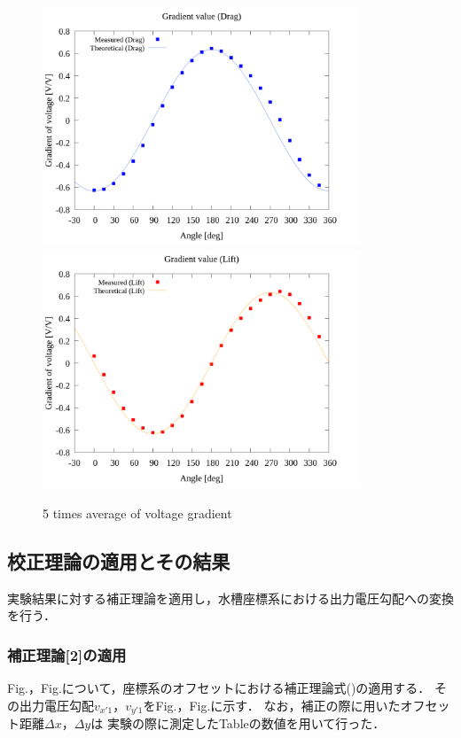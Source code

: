 \begin{figure}[htbp]
  \begin{center}
    \includegraphics[width=95mm]{../../02_workspace/result/2-ex/plot/21/21-1_summary_drag.png}
    \includegraphics[width=95mm]{../../02_workspace/result/2-ex/plot/21/21-1_summary_lift.png}
  \end{center}
  \caption{5 times average of voltage gradient}
\end{figure}

\newpage

\subsection{校正理論の適用とその結果}
実験結果に対する補正理論を適用し，水槽座標系における出力電圧勾配への変換を行う．

\subsubsection{補正理論[2]の適用}
Fig.，Fig.について，座標系のオフセットにおける補正理論式()の適用する．
その出力電圧勾配$v_{x'1}$，$v_{y'1}$をFig.，Fig.に示す．
なお，補正の際に用いたオフセット距離$\Delta x$，$\Delta y$は
実験の際に測定したTableの数値を用いて行った．

